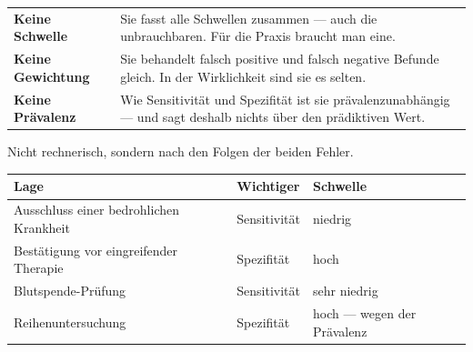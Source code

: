 \begin{warnung}
\begin{center}
\renewcommand{\arraystretch}{1.52}
\begin{tabular}{@{}P{2.6cm}P{6.0cm}@{}}
\toprule
\textbf{Keine Schwelle} & Sie fasst alle Schwellen zusammen --- auch die unbrauchbaren. Für die Praxis braucht man eine.\\
\textbf{Keine Gewichtung} & Sie behandelt falsch positive und falsch negative Befunde gleich. In der Wirklichkeit sind sie es selten.\\
\textbf{Keine Prävalenz} & Wie Sensitivität und Spezifität ist sie prävalenzunabhängig --- und sagt deshalb nichts über den prädiktiven Wert.\\
\bottomrule
\end{tabular}
\end{center}
\end{warnung}

\begin{merksatz}
Nicht rechnerisch, sondern nach den Folgen der beiden Fehler.

\begin{center}
{\small
\renewcommand{\arraystretch}{1.5}
\begin{tabular}{@{}P{3.0cm}P{2.2cm}P{3.0cm}@{}}
\toprule
\textbf{Lage} & \textbf{Wichtiger} & \textbf{Schwelle}\\
\midrule
Ausschluss einer bedrohlichen Krankheit & Sensitivität & niedrig\\
Bestätigung vor eingreifender Therapie & Spezifität & hoch\\
Blutspende-Prüfung & Sensitivität & sehr niedrig\\
Reihen\-untersuchung & Spezifität & \textcolor{akzent}{hoch --- wegen der Prävalenz}\\
\bottomrule
\end{tabular}}
\end{center}

\begin{center}
\begin{minipage}{0.88\textwidth}
\end{minipage}
\end{center}
\end{merksatz}

